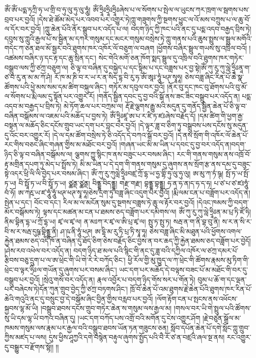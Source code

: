 ཨོཾ་ཨོཾ་པདྨ་ཏཀྲི་ཧ་ཡ་གྲི་བ་ཧུ་ལུ་ཧུ་ལུ་ཧཱུཾ། ཨོཾ་ཧྲཱིཿཧྲཱིཿཧྲཱིཿཞེས་པ་ལ་སོགས་པ་སྤེལ་ལ་ཡུངས་ཀར་ཁྲག་ལ་སྦགས་པས་བྲབ་པར་བྱའོ། །དེས་ཐེ་ཚོམ་མེད་པར་འབབ་པར་འགྱུར་ཏེ།ཀླུ་གཟུགས་ཀྱི་སྔགས་ཕྱུང་ལ་འོ་མས་བཀྲུས་པ་ལ་ཆུ་བོ་ལ་དོར་བར་བྱའོ། །ཀླུ་ཆེན་པོའི་ནོར་སྒྲུབ་པར་འདོད་པ་ལ། བདག་ཉིད་ཀྱི་ཁང་པའི་ནང་དུ་པདྨ་འདབ་བརྒྱད་བྲིས་ཏེ། དབུས་སུ་ཀླུའི་རྒྱལ་པོ་ས་སྦྱིན་མ་དཀར་གསུམ་དང་མངར་གསུམ་བསྲེས་ཏེ་ཀླུ་གནས་པའི་ཆུས་སྤྲུས་ལ་སྦྲུལ་མགོའི་གདེང་ཀ་ཅན་ཐལ་མོ་སྦྱར་བའི་ཐུགས་ཁར་འཁོར་ལོ་བཅུག་ལ་བཞག །ཕྱོགས་བཞིར་སྦྲུལ་གཡས་སུ་འཁྲིལ་བའོ། །འཚམས་བཞིར་ཉ་དང་རྟ་དང་ཆུ་སྲིན་དང་། སེང་གེའི་མགོ་ཅན་ཁོག་སྨད་སྦྲུལ་དུ་འཁྲིལ་བའི་ཐུགས་ཁར་གཏེར་བསྒྲུབ་ལས་ཀྱི་ཙཀྲ་བཅུག་ལ། ཅི་ལྟ་བ་བཞིན་དུ་བསྐྱེད་པ་དང་སྟིམ་པ་དང་བཟླས་པར་བྱ་སྟེ།ཨོཾ་ཀུ་རུ་ཀུ་ལླེ་ཧྲཱིཿནཱ་ག་ཙ་བ་རུ་ན་མ་མ་ཀོ་ཤཾ། རོ་ཁ་མ་ཎི་བ་ར་ཡ་ར་ན་སིད་དྷ་བི་རུ་ཧ་ཨོཾ་ཨཱཿ་ཧཱུཾ་ཕཊ་སྭཱཧཱ། ཅེས་བཟླ་ཞིང་རིན་པོ་ཆེ་སྣ་ཚོགས་པའི་ཕྱེ་མས་སམ་དམ་ཚིག་བསྐུལ་ཞིང་། གཏོར་མ་དབུལ་བར་བྱའོ། །ནོར་བུ་དང་ཁང་བུ་ཐོགས་པའི་བུ་མོ་ལ་སོགས་པ་རྨི་ལམ་དུ་སྟོན་པར་འགྱུར་རོ། །གནོད་སྦྱིན་དབང་དུ་བྱ་བའི་སྒོ་ནས་ཟང་ཟིང་བསྒྲུབ་པར་འདོད་ན། པདྨ་འདབ་མ་བརྒྱད་པ་བྲིས་ཏེ། མེ་ཏོག་ཆལ་པར་བཀྲམ་ལ། རྡོ་རྗེ་ལྕགས་རྒྱུ་མའི་མདུན་དུ་གནོད་སྦྱིན་ཆེན་པོ་ཅི་ལྟ་བ་བཞིན་བསྒོམས་ལ་འཇམ་པའི་མཆོད་པ་བྱས་ཏེ། ཨོཾ་ཧྲཱིཿཛཱ་ཨ་པ་ར་ཛི་ཏ་ཛཿཞེས་བརྗོད་དོ། །དམ་ཚིག་གི་ཕྱག་རྒྱ་བསྟན་ལ་མཆོད་ཅིང་དངོས་གྲུབ་ཡང་དག་པར་བླང་བར་བྱའོ། །དེ་ལྟར་ཟླ་བ་ཅིག་ཏུ་བསྒྲུབས་པས་དངོས་སུ་མདུན་དུ་འོང་བར་འགྱུར་རོ། །དེ་ལ་དམ་ཚོག་བསྲེས་ཏེ་ཅི་འདོད་དེ་བཀའ་སྒོ་བར་བྱའོ། །དེ་ནས་སྲོག་གི་འཁོར་ལོ་ཆེན་པོ་རང་གིས་བཅང་ཞིང་གཞན་གྱིས་མ་མཐོང་བར་བྱའོ། །གཞན་ཡང་མི་མ་ཡིན་པ་དབང་དུ་བྱ་བར་འདོད་ན།བདག་ཉིད་ཅི་ལྟ་བ་བཞིན་བསྒོམས་ལ། ལྕགས་ཀྱུ་སྙིང་ཁ་ནས་བཟུང་པར་བསམ་ཞིང་། རང་གི་གནས་གསུམ་ནས་འཁྲོ་བོ་རྟ་མགྲིན་དཔག་ཏུ་མེད་པ་སྤྲོས་ཏེ། མི་མ་ཡིན་པ་དེ་དག་གི་གནས་གསུམ་དུ་ཞུགས་ནས་སྲོག་རྩ་ནས་དམ་དུ་བཟུང་སྟེ་འདར་ཕྲི་ལི་ལི་བྱེད་པར་བསམ་ཞིང་། ཨོཾ་ཀུ་རུ་ཀུལླེ་ཧྲཱིཿབཛྲ་ཀྲོ་དྷ་ཡ་ཧྱ་གྷི་ཧུ་ལུ་ཧུ་ལུ། ཨ་མུ་ཀ་ཏཾ་ཥྚ། སྤོ་ཏ་ཡ་སྤོ་ཏ་ཡ། བི་སྥཱོ་ཏ་ཡ་བི་སྥཱོ་ཏ་ཡ། ཙྪནྡ་ཙྪནྡ། བིནྡྷ་བིདནྡྷ། གརྫ་གརྫ། བྷནྡྷ་བྷནྡྷ། ཧ་ན་ཧ་ན།ད་ཧ་ད་ཧ། པ་ཙ་པ་ཙ་ཛཿཧཱུཾ་བཾ་ཧོ། ཨ་ཀརྵ་ཡ་ཛ་ཧཱུཾ་ཧཱུཾ་ཕཊ་ཕཊ་སྭཱ་ཧཱ།ཅེས་དྲག་ཏུ་བཟླ་ཞིང་འདུག་པར་བྱའོ། །རྨི་ལམ་ངན་པ་བཟློག་པར་འདོད་ན།སྤེན་པ་དང་། བོང་བ་དང་། རིལ་མ་ལ་མངོན་སུམ་དུ་སྔགས་བཟླས་ཏེ་ཆུ་ལ་རྟོར་བར་བྱའོ། །དེའང་ཁམས་ཀྱི་བདག་མོར་བསྒོམས་ཏེ། ལྟས་དང་མཚན་མ་ངན་པ་ཐམས་ཅད་བཟློག་པར་དམིགས་ལ། ཨོཾ་ཀུ་རུ་ཀུ་ལླེ་ཧྲཱིཿན་མ་པྲ་ཏི་ཛོ་ཧི། ནིམ་བྷིན་དྷ་ཡ་ཀྲོ་དྷ་ཡ། ཛྭ་ལ་ཛྭ་ལ། ན་མཿཀ་ར་ཛྭ་ལ་ཨི་པྲ་ཛྭ་ལ། སྤུ་ཏ་སྤུ་ཏ། སརྦ་ན་ག་ནི་བྷ་བུ་ནི། ས་ར་ན་སི་ར་བི་ས་ར་སརྦ་དུཥྚ་བྷིནྡྷ་ནི། ཤ་ཥ་ནི་ཧཱུཾ་ཕཊ། ཨ་དྷི་མ་རུ་ཏི་པྲ་ཏི་སྭཱ་ཧཱ། ཅེས་བཟླ་ཞིང་མི་མཐུན་པའི་ཕྱོགས་འགལ་རྐྱེན་ཐམས་ཅད་འདི་ཁོ་ན་བཞིན་དུ་ཐོད་ཅིག་ཅེས་བརྗོད་ཅིང་བྱས་ན་བར་ཆད་ཀྱི་རྐྱེན་ཐམས་ཅད་བཟློག་པར་བྱེདོ། །ཤེས་རབ་འཕེལ་བར་འདོད་ན། བདག་ཉིད་ཐ་མལ་པའི་སྙིང་གི་ནང་དུ་ཟླ་བའི་དཀྱིལ་འཁོར་ལ་ཙཀྲ་དམར་པོ་རྩིབས་བཅུ་དྲུག་པ་ལ་ཨ་ཕྲེང་གི་ཡི་གེ་རེ་རེ་བཀོད་ཅིང་། ཕྱི་རོལ་གྱི་མུ་ཁྱུད་ལ་ཀ་ཕྲེང་གི་ཚོགས་རྣམས་མུ་ཏིག་གི་ཕྲེང་བ་ལྟར་ཧྲིཿལ་གཡོན་དུ་ཞུགས་པར་བསམ་ཞིང་། ཡང་དག་པར་མཆོད་དེ་བལྟས་བཟང་པོ་མ་མཐོང་གི་བར་དུ་བསྒྲུབ་པར་བྱའོ། །སྲེའུ་གསོ་བར་འདོད་ན། རྣལ་འབྱོར་པ་བདག་ཉིད་གོས་སར་པ་གོན་ཏེ། བུམ་པ་ཆོ་ག་དང་ལྡན་པར་བཞེངས་ཏེ།དོན་ཀུན་གྲུབ་བྱེད་ཀྱི་ཙཀྲ་བཏགས་ཤིང་། ཁྲོ་བོ་ཆེན་པོ་འམ་ཐུགས་རྗེ་ཆེན་པོའི་ཐུགས་ཁར་རིན་པོ་ཆེའི་གའུའི་ནང་དུ་བསྲུང་བྱ་དེ་བསྒོམ་ཞིང་བྱིན་གྱིས་བརླབ་པར་བྱའོ། །ལོག་རྟོག་ངན་པ་སྤངས་ནས་འཕོངས་སྐྱབས་ལྷ་མོ་ཡི། །བསྒྲུབ་ཐབས་དངོས་གྲུབ་གཏེར་ཆེན་ས་གསུམ་ལས་རྒྱལ་མ། །གསལ་བར་ཡི་གེ་སྤྲུལ་པའི་ཚོགས་སུ་ཡི་དམ་ལྷ་ཡི་བཀའ་བཞིན་དུ། །ཡང་དག་བཀོད་པས་འགྲོ་བའི་མགོན་དུ་ངེས་འགྱུར་ཤོག །རྗེ་བཙུན་སྒྲོལ་མ་ཁམས་གསུམ་ལས་རྣམ་པར་རྒྱལ་བའི་བསྒྲུབ་ཐབས་ཡོན་ཏན་གཟུངས་ཅན། སློབ་དཔོན་ཆེན་པོ་དགེ་སློང་ཀླུ་གྲུབ་ཀྱིས་མཛད་པ་ལས། དུས་ཕྱིས་ཤཱཀྱའི་དགེ་བསྙེན་བརྟུལ་ཞུགས་སྤྱོད་པའི་བཻ་རོ་ཙ་ན་བཛྲའི་ཞལ་སྔ་ནས། རང་འགྱུར་དུ་བསྒྱུར་བ་རྫོགས་སྷོ།། །།